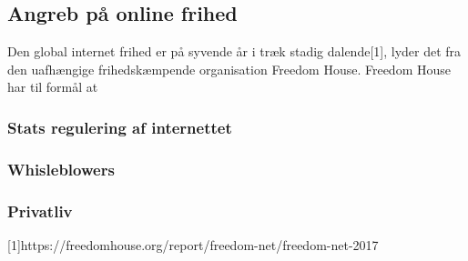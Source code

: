 \subsection{Angreb på online frihed}
Den global internet frihed er på syvende år i træk stadig dalende[1], lyder det fra den uafhængige frihedskæmpende organisation Freedom House. Freedom House har til formål at 

\subsubsection{Stats regulering af internettet}

\subsubsection{Whisleblowers}

\subsubsection{Privatliv}

[1]https://freedomhouse.org/report/freedom-net/freedom-net-2017